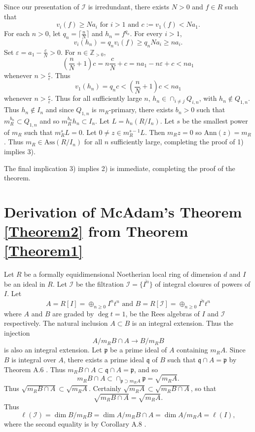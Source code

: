 \documentclass[11pt]{amsart}
\def\NZQ{\mathbb}               %
\def\ZZ{{\NZQ Z}}
\theoremstyle{definition}
\let\epsilon\varepsilon
\begin{document}
Since our presentation of $\mathcal I$ is irredundant, there exists $N>0$ and $f\in R$ such that 
$$
v_i(f)\ge Na_i\mbox{ for $i>1$ and $c:=v_1(f)<Na_1$.}
$$
For each $n>0$, let $q_n=\lceil \frac{n}{N}\rceil$ and $h_n=f^{q_n}$. For every $i>1$,
$$
v_i(h_n)=q_nv_i(f)\ge q_nNa_i\ge na_i.
$$
Set $\epsilon=a_1-\frac{c}{N}>0$.  For $n\in\ZZ_{>0}$, 
$$
\left(\frac{n}{N}+1\right)c=n\frac{c}{N}+c=na_1-n\epsilon+c<na_1
$$
whenever $n>\frac{c}{\epsilon}$. Thus
$$
v_1(h_n)=q_nc< \left(\frac{n}{N}+1\right)c<na_1
$$
whenever $n>\frac{c}{\epsilon}$. Thus for all sufficiently large $n$,
$h_n\in\cap_{i\ne j}Q_{i,n}$, with $h_n\not\in Q_{1,n}$. Thus $h_n\not\in I_n$ and since $Q_{1,n}$ is $m_R$-primary, there exists $b_n>0$ such that $m_R^{b_n}\subset Q_{1,n}$ and so $m_R^{b_n}h_n\subset I_n$. Let $L=h_n(R/I_n)$. Let $s$ be the smallest power of $m_R$ such that $m_R^sL=0$. Let $0\ne z\in m_R^{s-1}L$. Then $m_Rz=0$ so $\mbox{Ann}(z)=m_R$. Thus $m_R\in \mbox{Ass}(R/I_n)$ for all $n$ sufficiently large, completing the proof of 1) implies 3).

The final implication 3) implies 2) is immediate, completing the proof of the theorem.

\section{Derivation of McAdam's Theorem \ref{Theorem2} from Theorem \ref{Theorem1}}\label{SecThm2}

Let $R$ be a formally equidimensional Noetherian local ring of dimension $d$ and $I$ be an ideal in $R$. Let $\mathcal I$ be the  filtration  $\mathcal I=\{\overline{I^n}\}$ of integral closures of powers of $I$.
Let 
$$
A=R[I]=\oplus_{n\ge 0}I^nt^n\mbox{ and }B=R[\mathcal I]=\oplus_{n\ge 0}\overline{I^n}t^n
$$
where $A$ and $B$ are graded by $\deg t=1$, be the Rees algebras of $I$ and $\mathcal I$ respectively. The natural inclusion $A\subset B$ is an integral extension. Thus the injection
$$
A/m_RB\cap A\rightarrow B/m_RB
$$
is also an integral extension. Let $\mathfrak p$ be a prime ideal of $A$ containing $m_RA$. Since $B$ is integral over $A$, there exists a prime ideal $\mathfrak q$ of $B$ such that $\mathfrak q\cap A=\mathfrak p$ by Theorem A.6 \cite{BH}. Thus $m_RB\cap A\subset \mathfrak q\cap A=\mathfrak p$, and so
$$
m_RB\cap A\subset \cap_{\mathfrak p \supset m_RA}\mathfrak p=\sqrt{m_RA}.
$$
Thus $\sqrt{m_RB\cap A}\subset \sqrt{m_RA}$. Certainly $\sqrt{m_RA}\subset \sqrt{m_RB\cap A}$, so that 
$$
\sqrt{m_RB\cap A}=\sqrt{m_RA}.
$$
Thus 
\begin{equation}\label{eqT1}
\ell(\mathcal I)=\dim B/m_RB=\dim A/m_RB\cap A=\dim A/m_RA=\ell(I),
\end{equation}
where the second equality is by Corollary A.8 \cite{BH}.
\end{document}
